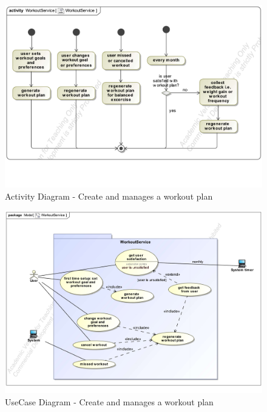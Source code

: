 \documentclass{article}
\begin{document}
		\begin{figure}[h!]
		    	\centering
		   	\captionsetup{labelformat=empty}
		   	\caption{Activity Diagram - Create and manages a workout plan}
		    	\includegraphics[width=\textwidth, angle=0]{Marc/workout/WorkoutServiceActivity.pdf}
		\end{figure}
		\clearpage
		\begin{figure}[h!]
			\centering
			\captionsetup{labelformat=empty}
			\caption{UseCase Diagram - Create and manages a workout plan}
		    	\includegraphics[width=\textwidth, angle=0]{Marc/workout/WorkoutServiceUseCase.pdf}
		\end{figure}
		\clearpage
\end{document}
